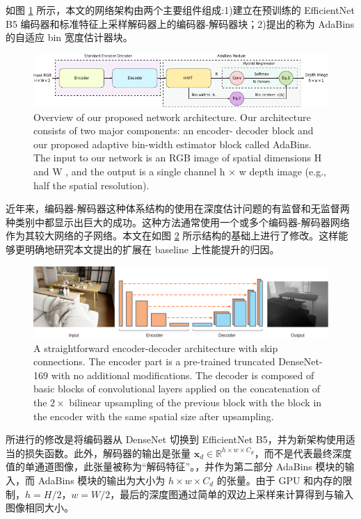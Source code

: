 \documentclass{vip-theme}
\begin{document}
 如图 \ref{fig:model} 所示，本文的网络架构由两个主要组件组成:1)建立在预训练的 EfficientNet B5 编码器和标准特征上采样解码器上的编码器-解码器块；2)提出的称为 AdaBins 的自适应 bin 宽度估计器块。
 

\begin{figure}[!htbp]
\centering
	\includegraphics[width=.7\paperwidth]{figure/model}
	\caption{Overview of our proposed network architecture. Our architecture consists of two major components: an encoder- decoder block and our proposed adaptive bin-width estimator block called AdaBins. The input to our network is an RGB image of spatial dimensions H and W , and the output is a single channel h × w depth image (e.g., half the spatial resolution).}
	\label{fig:model}
\end{figure}

近年来，编码器-解码器这种体系结构的使用在深度估计问题的有监督和无监督两种类别中都显示出巨大的成功。这种方法通常使用一个或多个编码器-解码器网络作为其较大网络的子网络。本文在如图 \ref{fig:model2} 所示结构的基础上进行了修改。这样能够更明确地研究本文提出的扩展在 baseline 上性能提升的归因。

\begin{figure}[!htbp]
\centering
	\includegraphics[width=.7\paperwidth]{figure/network_overview}
	\caption{A straightforward encoder-decoder architecture with skip connections. The encoder part is a pre-trained truncated DenseNet-169 with no additional modifications. The decoder is composed of basic blocks of convolutional layers applied on the concatenation of the $2\times$ bilinear upsampling of the previous block with the block in the encoder with the same spatial size after upsampling.}
	\label{fig:model2}
\end{figure}

所进行的修改是将编码器从 DenseNet 切换到 EfficientNet B5，并为新架构使用适当的损失函数。此外，解码器的输出是张量 $\textbf{x}_d \in \mathbb{R}^{h \times w \times C_d}$，而不是代表最终深度值的单通道图像，此张量被称为“解码特征”。，并作为第二部分 AdaBins 模块的输入，而 AdaBins 模块的输出为大小为 $h \times w \times C_d$ 的张量。由于 GPU 和内存的限制，$h=H/2$，$w=W/2$，最后的深度图通过简单的双边上采样来计算得到与输入图像相同大小。
\end{document}
